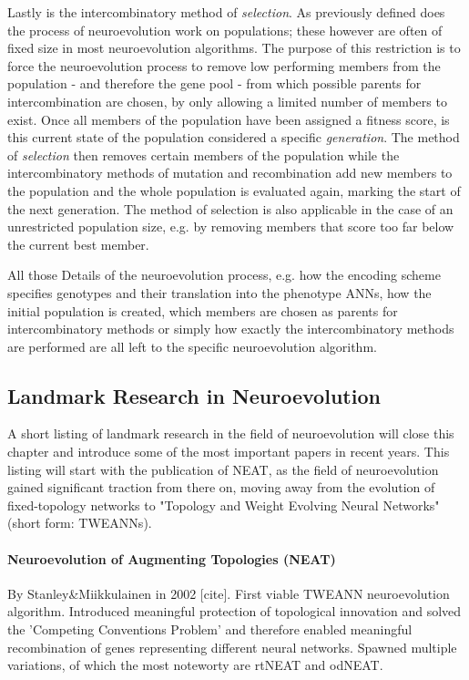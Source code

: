 \documentclass[journal, a4paper]{IEEEtran}
\begin{document}
Lastly is the intercombinatory method of \textit{selection}. As previously defined does the process of neuroevolution work on populations; these however are often of fixed size in most neuroevolution algorithms. The purpose of this restriction is to force the neuroevolution process to remove low performing members from the population - and therefore the gene pool - from which possible parents for intercombination are chosen, by only allowing a limited number of members to exist. Once all members of the population have been assigned a fitness score, is this current state of the population considered a specific \textit{generation}. The method of \textit{selection} then removes certain members of the population while the intercombinatory methods of mutation and recombination add new members to the population and the whole population is evaluated again, marking the start of the next generation. The method of selection is also applicable in the case of an unrestricted population size, e.g. by removing members that score too far below the current best member.

All those Details of the neuroevolution process, e.g. how the encoding scheme specifies genotypes and their translation into the phenotype ANNs, how the initial population is created, which members are chosen as parents for intercombinatory methods or simply how exactly the intercombinatory methods are performed are all left to the specific neuroevolution algorithm.



\subsection{Landmark Research in Neuroevolution}

A short listing of landmark research in the field of neuroevolution will close this chapter and introduce some of the most important papers in recent years. This listing will start with the publication of NEAT, as the field of neuroevolution gained significant traction from there on, moving away from the evolution of fixed-topology networks to "Topology and Weight Evolving Neural Networks" (short form: TWEANNs).

\paragraph{Neuroevolution of Augmenting Topologies (NEAT)} By Stanley\&Miikkulainen in 2002 [cite]. First viable TWEANN neuroevolution algorithm. Introduced meaningful protection of topological innovation and solved the 'Competing Conventions Problem' and therefore enabled meaningful recombination of genes representing different neural networks. Spawned multiple variations, of which the most noteworty are rtNEAT and odNEAT.
\end{document}
